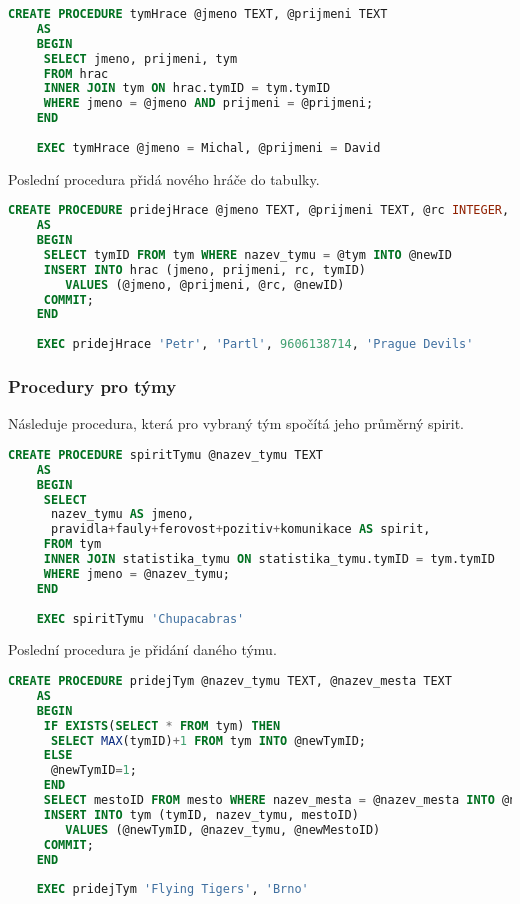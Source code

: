 \documentclass[11pt,oneside,american,czech]{book}
\begin{document}
\begin{lstlisting}[language=SQL]
	CREATE PROCEDURE tymHrace @jmeno TEXT, @prijmeni TEXT
	AS
	BEGIN
	 SELECT jmeno, prijmeni, tym
	 FROM hrac
	 INNER JOIN tym ON hrac.tymID = tym.tymID
	 WHERE jmeno = @jmeno AND prijmeni = @prijmeni;
	END
	
	EXEC tymHrace @jmeno = Michal, @prijmeni = David
\end{lstlisting}

Poslední procedura přidá nového hráče do tabulky.

\begin{lstlisting}[language=SQL]
	CREATE PROCEDURE pridejHrace @jmeno TEXT, @prijmeni TEXT, @rc INTEGER, @tym TEXT
	AS
	BEGIN
	 SELECT tymID FROM tym WHERE nazev_tymu = @tym INTO @newID
	 INSERT INTO hrac (jmeno, prijmeni, rc, tymID)
	 	VALUES (@jmeno, @prijmeni, @rc, @newID)
	 COMMIT;
	END
	
	EXEC pridejHrace 'Petr', 'Partl', 9606138714, 'Prague Devils'
\end{lstlisting}

\pagebreak
\subsubsection*{Procedury pro týmy}

Následuje procedura, která pro vybraný tým spočítá jeho průměrný spirit.

\begin{lstlisting}[language=SQL]
	CREATE PROCEDURE spiritTymu @nazev_tymu TEXT
	AS
	BEGIN
	 SELECT
	  nazev_tymu AS jmeno,
	  pravidla+fauly+ferovost+pozitiv+komunikace AS spirit,
	 FROM tym
	 INNER JOIN statistika_tymu ON statistika_tymu.tymID = tym.tymID
	 WHERE jmeno = @nazev_tymu;
	END
	
	EXEC spiritTymu 'Chupacabras'
\end{lstlisting}

Poslední procedura je přidání daného týmu.

\begin{lstlisting}[language=SQL]
	CREATE PROCEDURE pridejTym @nazev_tymu TEXT, @nazev_mesta TEXT
	AS
	BEGIN
	 IF EXISTS(SELECT * FROM tym) THEN
	  SELECT MAX(tymID)+1 FROM tym INTO @newTymID;
	 ELSE
	  @newTymID=1;
	 END
	 SELECT mestoID FROM mesto WHERE nazev_mesta = @nazev_mesta INTO @newMestoID
	 INSERT INTO tym (tymID, nazev_tymu, mestoID)
	 	VALUES (@newTymID, @nazev_tymu, @newMestoID)
	 COMMIT;
	END
	
	EXEC pridejTym 'Flying Tigers', 'Brno'
\end{lstlisting}
\end{document}
